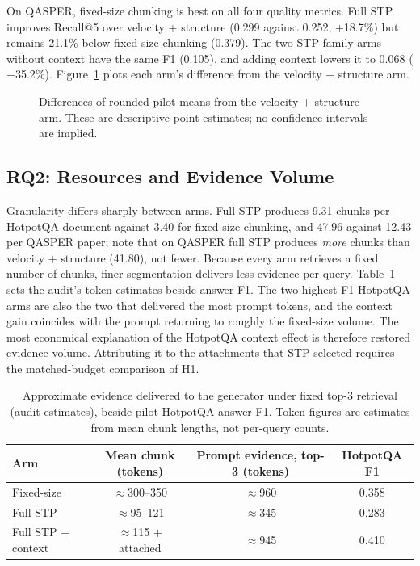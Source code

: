 \documentclass[10pt,a4paper]{article}
\begin{document}
On QASPER, fixed-size chunking is best on all four quality metrics. Full STP improves Recall@5 over velocity + structure (0.299 against 0.252, +18.7\%) but remains 21.1\% below fixed-size chunking (0.379). The two STP-family arms without context have the same F1 (0.105), and adding context lowers it to 0.068 ($-$35.2\%). Figure~\ref{fig:deltas} plots each arm's difference from the velocity + structure arm.

\begin{figure}[!htbp]
\centering

\caption{Differences of rounded pilot means from the velocity + structure arm. These are descriptive point estimates; no confidence intervals are implied.}
\label{fig:deltas}
\end{figure}

\subsection{RQ2: Resources and Evidence Volume}
Granularity differs sharply between arms. Full STP produces 9.31 chunks per HotpotQA document against 3.40 for fixed-size chunking, and 47.96 against 12.43 per QASPER paper; note that on QASPER full STP produces \emph{more} chunks than velocity + structure (41.80), not fewer. Because every arm retrieves a fixed number of chunks, finer segmentation delivers less evidence per query. Table~\ref{tab:budget} sets the audit's token estimates beside answer F1. The two highest-F1 HotpotQA arms are also the two that delivered the most prompt tokens, and the context gain coincides with the prompt returning to roughly the fixed-size volume. The most economical explanation of the HotpotQA context effect is therefore restored evidence volume. Attributing it to the attachments that STP selected requires the matched-budget comparison of H1.

\begin{table}[!htbp]
\caption{Approximate evidence delivered to the generator under fixed top-3 retrieval (audit estimates), beside pilot HotpotQA answer F1. Token figures are estimates from mean chunk lengths, not per-query counts.}
\label{tab:budget}
\centering\footnotesize
\begin{tabular}{@{}lccc@{}}
\toprule
Arm & Mean chunk (tokens) & Prompt evidence, top-3 (tokens) & HotpotQA F1 \\
\midrule
Fixed-size & $\approx$300--350 & $\approx$960 & 0.358 \\
Full STP & $\approx$95--121 & $\approx$345 & 0.283 \\
Full STP + context & $\approx$115 + attached & $\approx$945 & 0.410 \\
\bottomrule
\end{tabular}
\end{table}
\end{document}
